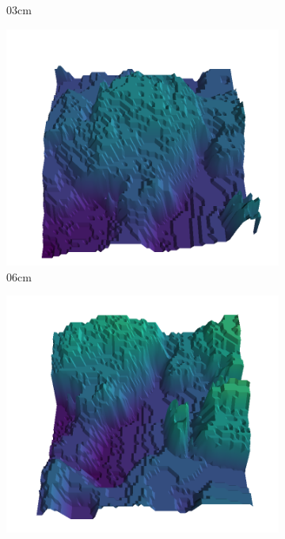 \documentclass[../document.tex]{subfiles}
\begin{document}
\begin{figure}[htbp]
\begin{subfigure}[b]{0.19\textwidth}
        \caption{$03$cm}
        \end{subfigure}
        \begin{subfigure}[b]{0.19\textwidth}
        \includegraphics[width=\linewidth]{../img/5/quarry/all/worst/06-patch-3d-majavi-colormap-6.png}
        \caption{$06$cm}
        \end{subfigure}
        \begin{subfigure}[b]{0.19\textwidth}
        \includegraphics[width=\linewidth]{../img/5/quarry/all/worst/06-patch-3d-majavi-colormap-7.png}

\end{subfigure}
\end{figure}
\end{document}
